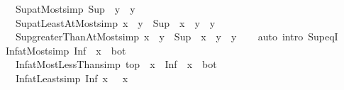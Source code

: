 \begin{isabellebody}
\ \ \ \ \ Sup{\isacharunderscore}{\kern0pt}atMost{\isacharbrackleft}{\kern0pt}simp{\isacharbrackright}{\kern0pt}{\isacharcolon}{\kern0pt}\ {\isachardoublequoteopen}Sup\ {\isacharbraceleft}{\kern0pt}{\isachardot}{\kern0pt}{\isachardot}{\kern0pt}\ y{\isacharbraceright}{\kern0pt}\ {\isacharequal}{\kern0pt}\ y{\isachardoublequoteclose}\isanewline
\ \ \ \ \ Sup{\isacharunderscore}{\kern0pt}atLeastAtMost{\isacharbrackleft}{\kern0pt}simp{\isacharbrackright}{\kern0pt}{\isacharcolon}{\kern0pt}\ {\isachardoublequoteopen}x\ {\isasymle}\ y\ {\isasymLongrightarrow}\ Sup\ {\isacharbraceleft}{\kern0pt}\ x\ {\isachardot}{\kern0pt}{\isachardot}{\kern0pt}\ y{\isacharbraceright}{\kern0pt}\ {\isacharequal}{\kern0pt}\ y{\isachardoublequoteclose}\isanewline
\ \ \ \ \ Sup{\isacharunderscore}{\kern0pt}greaterThanAtMost{\isacharbrackleft}{\kern0pt}simp{\isacharbrackright}{\kern0pt}{\isacharcolon}{\kern0pt}\ {\isachardoublequoteopen}x\ {\isacharless}{\kern0pt}\ y\ {\isasymLongrightarrow}\ Sup\ {\isacharbraceleft}{\kern0pt}\ x\ {\isacharless}{\kern0pt}{\isachardot}{\kern0pt}{\isachardot}{\kern0pt}\ y{\isacharbraceright}{\kern0pt}\ {\isacharequal}{\kern0pt}\ y{\isachardoublequoteclose}\isanewline
%
\isadelimproof
\ \ %
\endisadelimproof
%
\isatagproof
{}\isamarkupfalse%
\ {\isacharparenleft}{\kern0pt}auto\ intro{\isacharbang}{\kern0pt}{\isacharcolon}{\kern0pt}\ Sup{\isacharunderscore}{\kern0pt}eqI{\isacharparenright}{\kern0pt}%
\endisatagproof
{\isafoldproof}%
%
\isadelimproof
\isanewline
%
\endisadelimproof
\isanewline
{}\isamarkupfalse%
\isanewline
\ \ \ Inf{\isacharunderscore}{\kern0pt}atMost{\isacharbrackleft}{\kern0pt}simp{\isacharbrackright}{\kern0pt}{\isacharcolon}{\kern0pt}\ {\isachardoublequoteopen}Inf\ {\isacharbraceleft}{\kern0pt}{\isachardot}{\kern0pt}{\isachardot}{\kern0pt}\ x{\isacharbraceright}{\kern0pt}\ {\isacharequal}{\kern0pt}\ bot{\isachardoublequoteclose}\isanewline
\ \ \ \ \ Inf{\isacharunderscore}{\kern0pt}atMostLessThan{\isacharbrackleft}{\kern0pt}simp{\isacharbrackright}{\kern0pt}{\isacharcolon}{\kern0pt}\ {\isachardoublequoteopen}top\ {\isacharless}{\kern0pt}\ x\ {\isasymLongrightarrow}\ Inf\ {\isacharbraceleft}{\kern0pt}{\isachardot}{\kern0pt}{\isachardot}{\kern0pt}{\isacharless}{\kern0pt}\ x{\isacharbraceright}{\kern0pt}\ {\isacharequal}{\kern0pt}\ bot{\isachardoublequoteclose}\isanewline
\ \ \ \ \ Inf{\isacharunderscore}{\kern0pt}atLeast{\isacharbrackleft}{\kern0pt}simp{\isacharbrackright}{\kern0pt}{\isacharcolon}{\kern0pt}\ {\isachardoublequoteopen}Inf\ {\isacharbraceleft}{\kern0pt}x\ {\isachardot}{\kern0pt}{\isachardot}{\kern0pt}{\isacharbraceright}{\kern0pt}\ {\isacharequal}{\kern0pt}\ x{\isachardoublequoteclose}\isanewline

\end{isabellebody}
